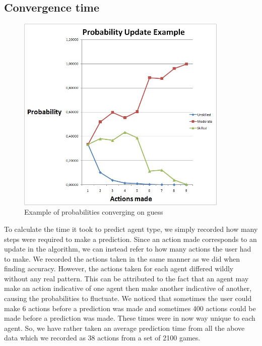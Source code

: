 \documentclass[11pt]{article}
\begin{document}
\subsection{    Convergence time}
\FloatBarrier
\begin{figure}[!h]
	\centering
	\includegraphics[width=0.9\textwidth]{eg.jpg}
	\caption{Example of probabilities converging on guess}
	\label{Figure 4}
\end{figure}
\FloatBarrier

To calculate the time it took to predict agent type, we simply recorded how many steps were required to make a prediction. Since an action made corresponds to an update in the algorithm, we can instead refer to how many actions the user had to make. We recorded the actions taken in the same manner as we did when finding accuracy. However, the actions taken for each agent differed wildly without any real pattern. This can be attributed to the fact that an agent may make an action indicative of one agent then make another indicative of another, causing the probabilities to fluctuate. We noticed that sometimes the user could make 6 actions before a prediction was made and sometimes 400 actions could be made before a prediction was made. These times were in now way unique to each agent. So, we have rather taken an average prediction time from all the above data which we recorded as 38 actions from a set of 2100 games.

\clearpage
\end{document}
